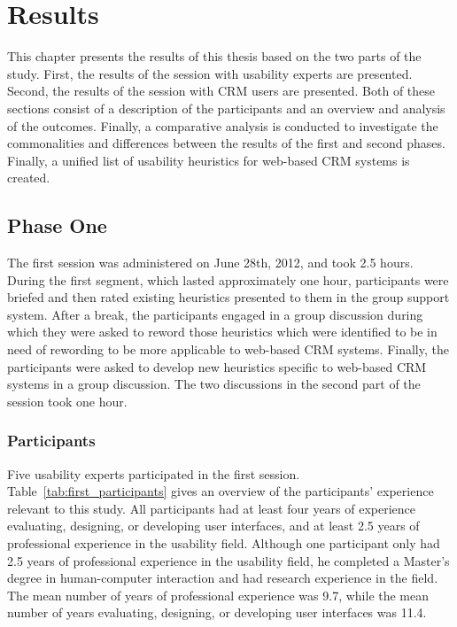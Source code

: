 \chapter{Results}
\label{chap:findings}
This chapter presents the results of this thesis based on the two parts of the study. First, the results of the session with usability experts are presented. Second, the results of the session with CRM users are presented. Both of these sections consist of a description of the participants and an overview and analysis of the outcomes. Finally, a comparative analysis is conducted to investigate the commonalities and differences between the results of the first and second phases. Finally, a unified list of usability heuristics for web-based CRM systems is created.

\section{Phase One}
The first session was administered on June 28th, 2012, and took 2.5 hours. During the first segment, which lasted approximately one hour, participants were briefed and then rated existing heuristics presented to them in the group support system. After a break, the participants engaged in a group discussion during which they were asked to reword those heuristics which were identified to be in need of rewording to be more applicable to web-based CRM systems. Finally, the participants were asked to develop new heuristics specific to web-based CRM systems in a group discussion. The two discussions in the second part of the session took one hour.

\subsection{Participants}
Five usability experts participated in the first session. Table~\ref{tab:first_participants} gives an overview of the participants' experience relevant to this study. All participants had at least four years of experience evaluating, designing, or developing user interfaces, and at least 2.5 years of professional experience in the usability field. Although one participant only had 2.5 years of professional experience in the usability field, he completed a Master's degree in human-computer interaction and had research experience in the field. The mean number of years of professional experience was 9.7, while the mean number of years evaluating, designing, or developing user interfaces was 11.4.

